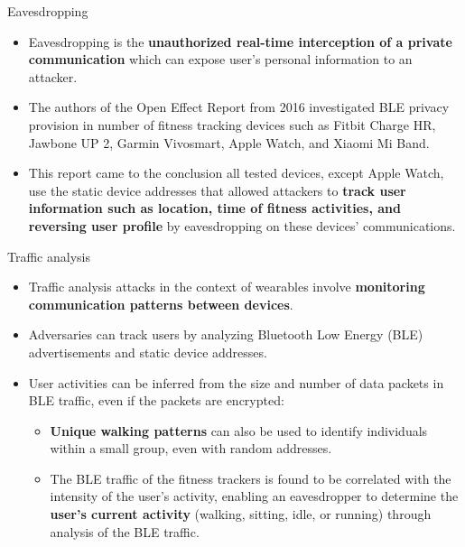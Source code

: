 \documentclass[ucs,9pt,usenames,dvipsnames]{beamer}
\begin{document}
\iffalse
\begin{frame}{Eavesdropping}
	\begin{itemize}
		\item Eavesdropping is the \textbf{unauthorized real-time interception of a private communication} which can expose user’s personal information to an attacker.
		\item The authors of the Open Effect Report from 2016 \cite{b7} investigated BLE privacy provision in number of fitness tracking devices such as Fitbit Charge HR, Jawbone UP 2, Garmin Vivosmart, Apple Watch, and Xiaomi Mi Band.
		\item This report came to the conclusion all tested devices, except Apple Watch, use the static device addresses that allowed attackers to \textbf{track user information such as location, time of fitness activities, and reversing user profile} by eavesdropping on these devices’ communications.
	\end{itemize}
\end{frame}

\begin{frame}{Traffic analysis}
	\begin{itemize}
		\item Traffic analysis attacks in the context of wearables involve \textbf{monitoring communication patterns between devices}.
		\item Adversaries can track users by analyzing Bluetooth Low Energy (BLE) advertisements and static device addresses. 
		\item User activities can be inferred from the size and number of data packets in BLE traffic, even if the packets are encrypted:
		\begin{itemize}
			\item \textbf{Unique walking patterns} can also be used to identify individuals within a small group, even with random 	addresses.
			\item The BLE traffic of the fitness trackers is found to be correlated with the intensity	of the user’s activity, enabling an eavesdropper to determine 		the \textbf{user’s current activity} (walking, sitting, idle, or running) through analysis of the BLE traffic.
		\end{itemize} 
	\end{itemize}
\end{frame}
\end{document}
